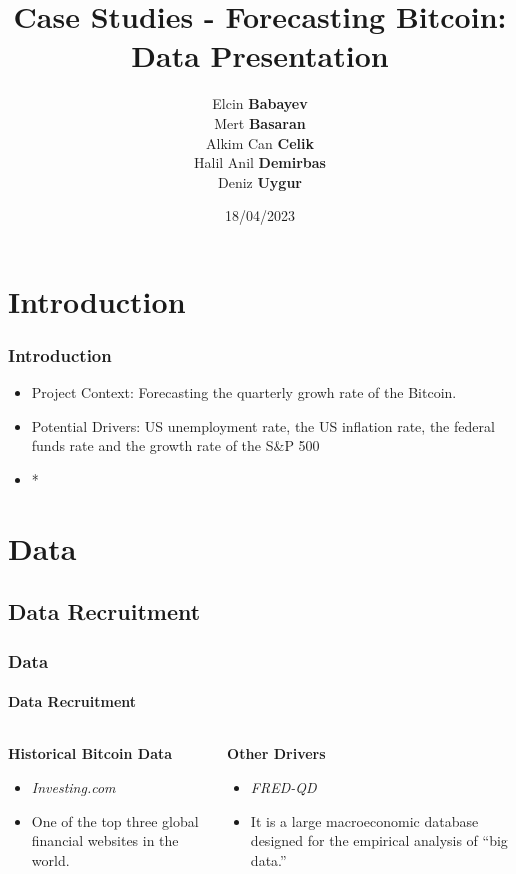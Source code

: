 \documentclass{beamer}
\title{Case Studies - Forecasting Bitcoin: \\Data Presentation}
\author{Elcin \textbf {Babayev}\\
Mert \textbf{Basaran}\\
Alkim Can \textbf{Celik}\\
Halil Anil \textbf{Demirbas}\\
Deniz \textbf{Uygur}}
\institute{Technische Universität Dortmund}
\date{18/04/2023}
\begin{document}
	\begin{frame}
		\titlepage %
	\end{frame}
	\section{Introduction}
	\begin{frame}
		\frametitle{Introduction}
		\begin{itemize}
			\item Project Context: Forecasting the quarterly growh rate of the Bitcoin.
			\item Potential Drivers: US unemployment rate, the US inflation rate, the federal funds rate and the growth rate of the S\&P 500
			\item *
		\end{itemize}
	\end{frame}
	\section{Data}
	\subsection{Data Recruitment}
		\begin{frame}
		\frametitle{Data}
		\framesubtitle{Data Recruitment}
			\begin{columns}
				\begin{column}{0.5\textwidth}
					\textbf{Historical Bitcoin Data}
					\begin{itemize}
						\item \emph {Investing.com}
						\item One of the top three global financial websites in the world.
					\end{itemize}
				\end{column}
				\begin{column}{0.5\textwidth}
					\textbf{Other Drivers}
				\begin{itemize}
					\item \emph{FRED-QD}
					\item It is a large macroeconomic database designed for the empirical analysis of “big data.”
				\end{itemize}
				\end{column}
		\end{columns}
	\end{frame}
\end{document}

